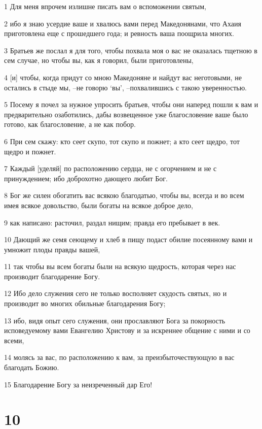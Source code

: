 \par 1 Для меня впрочем излишне писать вам о вспоможении святым,
\par 2 ибо я знаю усердие ваше и хвалюсь вами перед Македонянами, что Ахаия приготовлена еще с прошедшего года; и ревность ваша поощрила многих.
\par 3 Братьев же послал я для того, чтобы похвала моя о вас не оказалась тщетною в сем случае, но чтобы вы, как я говорил, были приготовлены,
\par 4 [и] чтобы, когда придут со мною Македоняне и найдут вас неготовыми, не остались в стыде мы, --не говорю `вы', --похвалившись с такою уверенностью.
\par 5 Посему я почел за нужное упросить братьев, чтобы они наперед пошли к вам и предварительно озаботились, дабы возвещенное уже благословение ваше было готово, как благословение, а не как побор.
\par 6 При сем скажу: кто сеет скупо, тот скупо и пожнет; а кто сеет щедро, тот щедро и пожнет.
\par 7 Каждый [уделяй] по расположению сердца, не с огорчением и не с принуждением; ибо доброхотно дающего любит Бог.
\par 8 Бог же силен обогатить вас всякою благодатью, чтобы вы, всегда и во всем имея всякое довольство, были богаты на всякое доброе дело,
\par 9 как написано: расточил, раздал нищим; правда его пребывает в век.
\par 10 Дающий же семя сеющему и хлеб в пищу подаст обилие посеянному вами и умножит плоды правды вашей,
\par 11 так чтобы вы всем богаты были на всякую щедрость, которая через нас производит благодарение Богу.
\par 12 Ибо дело служения сего не только восполняет скудость святых, но и производит во многих обильные благодарения Богу;
\par 13 ибо, видя опыт сего служения, они прославляют Бога за покорность исповедуемому вами Евангелию Христову и за искреннее общение с ними и со всеми,
\par 14 молясь за вас, по расположению к вам, за преизбыточествующую в вас благодать Божию.
\par 15 Благодарение Богу за неизреченный дар Его!

\chapter{10}

